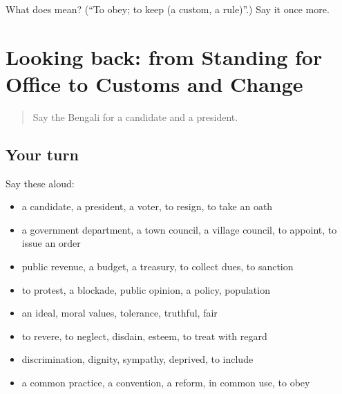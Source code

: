 \begin{tcolorbox}[breakable,colback=teal!4,colframe=teal!35!black,title={Before you move on}]
What does  mean? (\textquotedblleft{}To obey; to keep (a custom, a rule)\textquotedblright{}.) Say it once more.
\end{tcolorbox}
\section[(dialogue)]{Looking back: from Standing for Office to Customs and Change}

\label{lesson:BN-R353-review-346-353}



\begin{quote}
Say the Bengali for a candidate and a president.
\end{quote}

\subsection*{Your turn}
Say these aloud:

\begin{itemize}
\raggedright
  \item a candidate, a president, a voter, to resign, to take an oath
  \item a government department, a town council, a village council, to appoint, to issue an order
  \item public revenue, a budget, a treasury, to collect dues, to sanction
  \item to protest, a blockade, public opinion, a policy, population
  \item an ideal, moral values, tolerance, truthful, fair
  \item to revere, to neglect, disdain, esteem, to treat with regard
  \item discrimination, dignity, sympathy, deprived, to include
  \item a common practice, a convention, a reform, in common use, to obey
\end{itemize}

